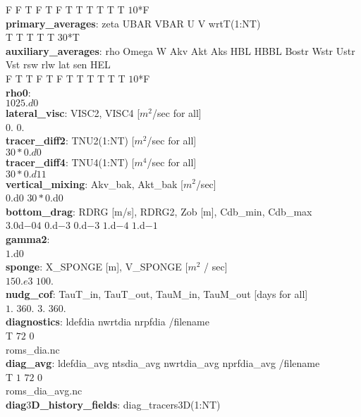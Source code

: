 F   F     T   F    T    F    T   T    T     T    T    T $10$*F \\
\textbf{primary\_averages}: zeta UBAR VBAR  U  V   wrtT(1:NT) \\
T    T    T    T  T   $30$*T      \\
\textbf{auxiliary\_averages}: rho Omega  W  Akv  Akt  Aks  HBL HBBL Bostr Wstr Ustr Vst  rsw rlw lat sen HEL \\
F   T     T   F    T    F    T   T    T     T   T    T     $10$*F\\
\textbf{rho0}: \\
$1025.d0$ \\
\textbf{lateral\_visc}:   VISC2,    VISC4    [$m^{2}$/sec for all] \\
$0.$       $0.$\\
\textbf{tracer\_diff2}: TNU2(1:NT)           [$m^2$/sec for all] \\
$30*0.d0$ \\
\textbf{tracer\_diff4}: TNU4(1:NT)           [$m^4$/sec for all] \\
$30*0.d11$ \\
\textbf{vertical\_mixing}: Akv\_bak, Akt\_bak [$m^2$/sec] \\
$0.$d$0$    $30*0.$d$0$ \\
\textbf{bottom\_drag}:     RDRG [m/s],  RDRG2,  Zob [m],  Cdb\_min, Cdb\_max \\
$3.0$d$-04$ $0.$d$-3$ $0$.d$-3$ $1$.d$-4$ $1$.d$-1$
\\
\textbf{gamma2}: \\
$1.$d$0$ \\
\textbf{sponge}:          X\_SPONGE [m],    V\_SPONGE [$m^2$ / sec] \\
$150.e3$           $100.$ \\
\textbf{nudg\_cof}:    TauT\_in, TauT\_out, TauM\_in, TauM\_out  [days for all]\\
$1.$       $360.$      $3.$      $360.$ \\
\textbf{diagnostics}:   ldefdia   nwrtdia    nrpfdia /filename \\
T        $72$         $0$ \\
roms\_dia.nc \\
\textbf{diag\_avg}: ldefdia\_avg  ntsdia\_avg  nwrtdia\_avg  nprfdia\_avg /filename \\
               T          $1 $          $72$            0 \\
                                 roms\_dia\_avg.nc \\
\textbf{diag$3$D\_history\_fields}: diag\_tracers$3$D(1:NT) \\
